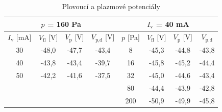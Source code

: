 \documentclass[a4paper,12pt]{article}
\begin{document}
\begin{center}
	\begin{table}[h!]
		\centering
		\caption{Plovoucí a plazmové potenciály}
		\label{tab1}
		\begin{tabular}{|c|c|c|c|c|c|c|c|} \hline
			\multicolumn{4}{|c|}{$p$ = 160 \si{\pascal}}& 
			\multicolumn{4}{c|}{$I_\text{v}$ = 40 \si{\milli\ampere} }  \\ 
			\hline
			$I_\text{v}$ [\si{\milli\ampere}] &  $V_\text{fl}$ [V] & 
			$V_\text{p}$ [V] & $V_\text{p,d}$ [V] & $p$ [\si{\pascal}] &  
			$V_\text{fl}$ [V] & $V_\text{p}$ [V] & $V_\text{p,d}$ \\ \hline
			30 & -48,0 & -47,7 & -43,4 & 8 & -45,3 & -44,8 & -43,8 \\ \hline
			40 & -43,8 & -43,4 & -39,7 & 16 & -45,8 & -45,2 & -44,4 \\ \hline
			50 & -42,2 & -41,6 & -37,5 & 32 & -45,0 & -44,6 & -43,4 \\ \hline
			& & & & 80 & -44,4 & -43,9 & -42,8 \\ \hline
			& & & & 200 & -50,9 & -49,9 & -45,8 \\ \hline
			
		\end{tabular}
	\end{table}
\end{center}
\end{document}
